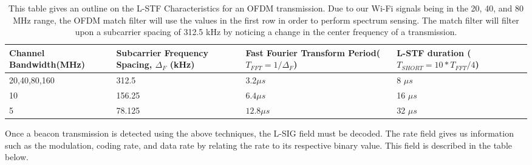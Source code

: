 \begin{table}[ht!]
	\centering
	\caption{This table gives an outline on the L-STF Characteristics for an OFDM transmission. Due to our Wi-Fi signals being in the 20, 40, and 80 MHz range, the OFDM match filter will use the values in the first row in order to perform spectrum sensing. The match filter will filter upon a subcarrier spacing of 312.5 kHz by noticing a change in the center frequency of a transmission.}	
\begin{tabular}{|p{3.6cm}|p{4cm}|p{4cm}|p{4.5cm}|}
	\hline
	Channel Bandwidth\newline(MHz) & Subcarrier Frequency Spacing, $\Delta_F$ (kHz) &Fast Fourier Transform Period\newline($T_{FFT}=1/\Delta_F$)& L-STF duration \newline($T_{SHORT}=10*T_{FFT}/4$) \\
	\hline
	20,40,80,160 & 312.5 &3.2$\mu s$ &8 $\mu s$ \\
	10 & 156.25 &$6.4\mu s$ &16 $\mu s $\\
	5 & 78.125 &$12.8\mu s$ &32 $\mu s$  \\
	\hline
\end{tabular} 

	\label{table:spacing}
\end{table} \par 
	
Once a beacon transmission is detected using the above techniques, the L-SIG field must be decoded. The rate field gives us information such as the modulation, coding rate, and data rate by relating the rate to its respective binary value. This field is described in the table below.


